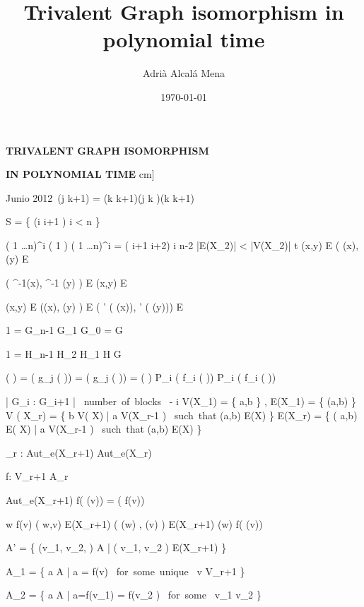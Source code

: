 \documentclass[12pt,a4paper]{book}
\author{Adrià Alcalá Mena}
\title{Trivalent Graph isomorphism in polynomial time}
\date{\today}
\theoremstyle{plain}
\theoremstyle{definition}
\theoremstyle{remark}
\begin{document}
\clearpage{}\thispagestyle{empty}
\vspace*{7mm}
\begin{center}
{\Large\bf TRIVALENT GRAPH ISOMORPHISM }

{\Large\bf IN POLYNOMIAL TIME }\1cm]







{\large Junio 2012}\
 (j \; k+1) = (k \; k+1)(j \; k )(k \; k+1)

 S = \{ (i \; i+1 )  \leq i < n \}

 ( 1 \ldots n)^i ( 1  ) ( 1 \ldots n)^i = ( i+1 \; i+2)  \leq i \leq n-2
|E(X_2)| < |V(X_2)| \cdot t 
 (x,y) \in E \Leftrightarrow ( \varphi(x), \varphi(y) \in E 

 ( \varphi^{-1}(x), \varphi^{-1} (y) ) \in E \Leftrightarrow (x,y) \in E

 (x,y) \in E \Leftrightarrow (\varphi(x), \varphi(y) ) \in E \Leftrightarrow ( \varphi' ( \varphi (x)), \varphi' ( \varphi (y))) \in E

 1 = G_{n-1} \subseteq \cdots \subseteq G_1 \subseteq G_0 = G

 1 = H_{n-1} \subseteq \cdots H_2 \subseteq H_1 \subseteq H \subseteq G

  ( \gamma) = ( g_j ( \alpha)) =  ( g_j ( \beta)) =  ( \delta) \supseteq P_i ( f_i ( \gamma)) \cup P_i ( f_i ( \delta ))

 | G_i : G_{i+1} | \leq \mbox{ number of blocks } - i 
V(X_1) = \{ a,b \} \; , \; E(X_1) = \{ (a,b) \} V ( X_r) = \{ b \in V( X) \; | \; \exists a \in V(X_{r-1} ) \mbox{ such that} (a,b) \in E(X) \} 
 E(X_r) =  \{ ( a,b) \in E( X) \; | \; \exists a \in V(X_{r-1} ) \mbox{ such that} (a,b) \in E(X) \}

 \pi_r : Aut_e(X_{r+1}) \rightarrow Aut_e(X_r)

 f: V_{r+1} \rightarrow A_r

  \sigma \in Aut_e(X_{r+1}) \Rightarrow f( \sigma (v)) = \sigma ( f(v))
 
w \in f(v) \Leftrightarrow ( w,v) \in E(X_{r+1}) \Leftrightarrow ( \sigma(w) , \sigma(v) ) \in E(X_{r+1}) 
\Leftrightarrow \sigma(w) \in f( \sigma (v))

 A' = \{ (v_1, v_2, ) \in A \; | \; ( v_1, v_2 ) \in  E(X_{r+1}) \}

 A_1 = \{ a \in A \; | \; a = f(v) \mbox{ for some unique } v \in V_{r+1} \}

 A_2 = \{ a \in A \; | \; a=f(v_1) = f(v_2 ) \mbox{ for some } v_1  \neq v_2 \}


\end{center}
\end{document}
